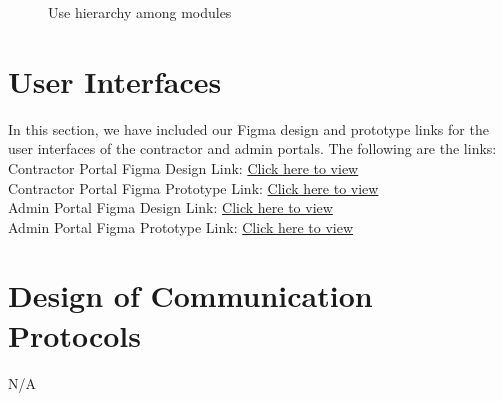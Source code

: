 \documentclass[12pt, titlepage]{article}
\begin{document}

\begin{figure}[H]
  \centering
  \caption{Use hierarchy among modules}
  \label{FigUH}
\end{figure}


\section{User Interfaces}

In this section, we have included our Figma design and prototype links for
the user interfaces of the contractor and admin portals.
The following are the links:\\

Contractor Portal Figma Design Link:
\href{https://www.figma.com/design/GahKyyNYENo3SdcAqpEoiX/SyncMaster?
node-id=6036-164056}{Click here to view}\\

Contractor Portal Figma Prototype Link:
\href{https://www.figma.com/proto/GahKyyNYENo3SdcAqpEoiX/SyncMaster?
  node-id=11645-13888&p=f&t=jk9BlgaZnti1meDo-1&scaling=scale-down&
  content-scaling=fixed&page-id=6036\%3A164056&starting-point-node-
id=11645\%3A13888}{Click here to view}\\

Admin Portal Figma Design Link:
\href{https://www.figma.com/design/GahKyyNYENo3SdcAqpEoiX/SyncMaster?
node-id=11668-1623}{Click here to view}\\

Admin Portal Figma Prototype Link:
\href{https://www.figma.com/proto/GahKyyNYENo3SdcAqpEoiX/SyncMaster?
  node-id=11668-1625&t=NMRH5A1EbNxP3k37-1&scaling=min-zoom&
  content-scaling=fixed&page-id=11668\%3A1623&
starting-point-node-id=11668\%3A1625}{Click here to view}\\
\section{Design of Communication Protocols}

N/A
\end{document}
